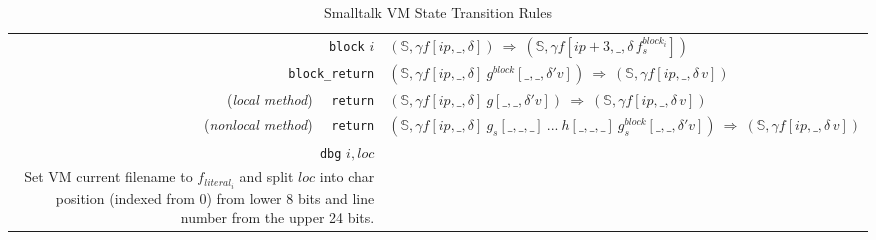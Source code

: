 \documentclass[11pt]{article}
\begin{document}
\begin{table}[tbp]
\begin{center}
\begin{tabular}[t]{|r|l|}
{\tt block} $i$  & $(\mathbb{S},\gamma f[ip,\_,\delta]) ~\Rightarrow~ (\mathbb{S},\gamma f[ip+3,\_,\delta \,f^{block_i}_s])$\\

{\tt block\_return} &  $(\mathbb{S},\gamma f[ip,\_,\delta]~g^{block}[\_,\_,\delta' v]) ~\Rightarrow~ (\mathbb{S},\gamma f[ip,\_,\delta \,v])$\\

({\em local method}) ~~{\tt return} & $(\mathbb{S},\gamma f[ip,\_,\delta] ~g[\_,\_,\delta' v]) ~\Rightarrow~ (\mathbb{S},\gamma f[ip,\_,\delta \,v])$\\

({\em nonlocal method}) ~~{\tt return} & $(\mathbb{S},\gamma f[ip,\_,\delta] ~g_s[\_,\_,\_]~ ... ~h[\_,\_,\_] ~ g^{block}_s[\_,\_,\delta' v]) ~\Rightarrow~ (\mathbb{S},\gamma f[ip,\_,\delta \,v])$\\

\hline

{\tt dbg} $i, loc$ &
\begin{minipage}[c]{.76\linewidth}
$(\mathbb{S},\gamma f[ip,\_,\_])\Rightarrow
 (\mathbb{S}[\text{\it file}\text{=}f_{literal_i}, \text{\it line}\text{=}loc[31\text{:}8], \text{\it col}\text{=}loc[7\text{:}0]],\gamma f[ip+7,\_,\_])$ \\
Set VM current filename to $f_{literal_i}$ and split $loc$ into char position (indexed from 0) from lower 8 bits and line number  from the upper 24 bits.
\end{minipage}\\
\hline
\end{tabular}
\end{center}
\vspace{-10pt}
\caption{Smalltalk VM State Transition Rules}
\label{default}
\end{table}%

\begin{minipage}[c]{0.25\linewidth}
\begin{alltt}
\end{alltt}
\end{minipage} 
\end{document}
